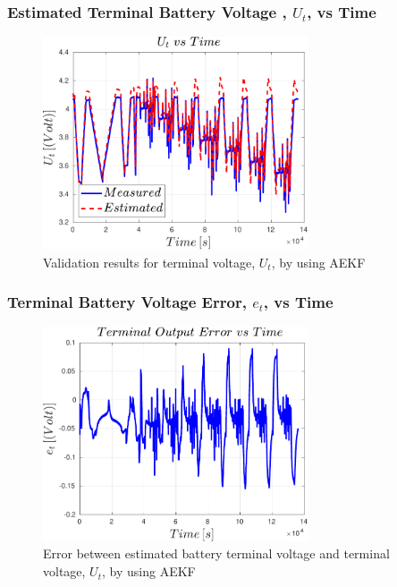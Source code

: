 \documentclass{beamer}
\begin{document}
\begin{frame}
	
	\frametitle{Estimated Terminal Battery Voltage , $U_{t}$,  vs Time}
	
	\begin{figure}
		\centering
		\includegraphics[width=0.7\textwidth, keepaspectratio]{images/AEKF_Terminal_Voltage.pdf}
		\caption{Validation results for terminal voltage, $U_{t}$, by using AEKF}
		\label{fig:The_AEKF_Terminal_Voltage}
	\end{figure}
	
\end{frame}


\begin{frame}
	
	\frametitle{Terminal Battery Voltage Error, $e_{t}$,  vs Time}
	
	\begin{figure}
		\centering
		\includegraphics[width=0.7\textwidth, keepaspectratio]{images/AEKF_Terminal_Voltage_Error.pdf}
		\caption{Error between estimated battery terminal voltage and  terminal voltage, $U_{t}$, by using AEKF}
		\label{fig:The_AEKF_Terminal_Voltage_Error}
	\end{figure}
	
\end{frame}
\end{document}
